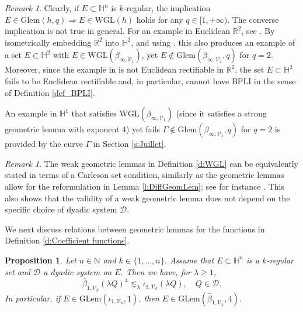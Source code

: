 \documentclass[12pt]{amsart}
\renewcommand{\H}{\mathbb H}
\numberwithin{equation}{section}
\theoremstyle{plain}
\newtheorem{proposition}[theorem]{Proposition}
\theoremstyle{definition}
\theoremstyle{remark}
\newtheorem{remark}[theorem]{Remark}
\begin{document}
\begin{remark}\label{r:WGLNothingelse}
Clearly, if $E\subset \H^n$ is $k$-regular, the implication $E\in\mathrm{Glem}(h,q)\Rightarrow E\in \mathrm{WGL}(h)$ holds for any $q\in[1,+\infty)$. The converse implication is not true in general. For an example in Euclidean $\mathbb{R}^2$, see \cite[Section 20]{David1}. By isometrically embedding $\mathbb{R}^2$ into $\mathbb{H}^2$, and using \cite[Lemma 4.38]{FV2}, this also produces an example of a set $E\subset \mathbb{H}^2$ with $E\in \mathrm{WGL}(\beta_{\infty,\mathcal{V}_1})$, yet $E\notin\mathrm{Glem}(\beta_{\infty,\mathcal{V}_1},q)$ for $q=2$. Moreover, since the example in \cite[Section 20]{David1} is not Euclidean rectifiable in $\mathbb{R}^2$, the set $E\subset \mathbb{H}^2$ fails to be Euclidean rectifiable and, in particular, cannot have BPLI in the sense of Definition \ref{def_BPLI}.

An example in $\mathbb{H}^1$ that satisfies $\mathrm{WGL}(\beta_{\infty,\mathcal{V}_1})$ (since it satisfies a strong geometric lemma with exponent $4$) yet fails $\Gamma\notin\mathrm{Glem}(\beta_{\infty,\mathcal{V}_1},q)$ for $q=2$ is provided by the curve  $\Gamma$ in Section \ref{s:Juillet}. 
\end{remark}


\begin{remark}
The weak geometric lemmas in Definition \ref{d:WGL} can be equivalently stated in terms of a Carleson set condition, similarly as the geometric lemmas allow for the reformulation  in 
Lemma \ref{l:DiffGeomLem}; see for instance \cite[Lemma 2.6.5]{Bate}. This also shows that the validity of a weak geometric lemma does not depend on the specific choice of dyadic system $\mathcal{D}$.
\end{remark}

We next discuss relations between geometric lemmas for the  functions in Definition \ref{d:Coefficient functions}.

\begin{proposition}\label{p:FromIotaToStratifAssumpt}
    Let $n\in \mathbb{N}$ and $k\in \{1,\ldots,n\}$. Assume that $E\subset \mathbb{H}^n$ is a $k$-regular set and $\mathcal{D}$ a dyadic system on $E$. Then we have, for $\lambda \geq 1$,
    \begin{displaymath}
        \widehat{\beta}_{1,\mathcal{V}_k}(\lambda Q)^4 \lesssim_{\lambda} \iota_{1,\mathcal{V}_k}(\lambda Q),\quad Q\in \mathcal{D}.    \end{displaymath}
    In particular, if
$E\in \mathrm{GLem}(\iota_{1,\mathcal{V}_k},1)$, then $E\in \mathrm{GLem}(\widehat{\beta}_{1,\mathcal{V}_k},4)$.
\end{proposition}
\end{document}
